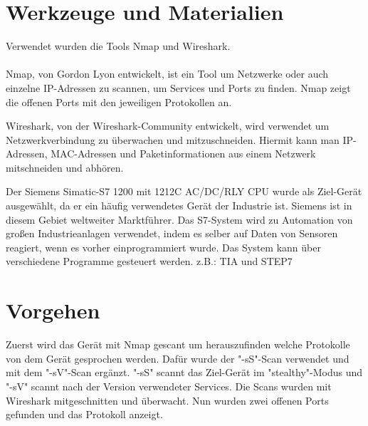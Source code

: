 \section{Werkzeuge und Materialien}

Verwendet wurden die Tools Nmap und Wireshark.\\
\\
 Nmap, von Gordon Lyon entwickelt, ist ein Tool um Netzwerke oder auch einzelne IP-Adressen zu scannen, um Services und Ports zu finden. 
Nmap zeigt die offenen Ports mit den jeweiligen Protokollen an.\cite{nmap}
	  
 Wireshark, von der Wireshark-Community entwickelt, wird verwendet um Netzwerkverbindung zu überwachen und mitzuschneiden.
 Hiermit kann man IP-Adressen, MAC-Adressen und Paketinformationen aus einem Netzwerk mitschneiden und abhören.\cite{wire}

 Der Siemens Simatic-S7 1200 mit 1212C AC/DC/RLY CPU wurde als Ziel-Gerät ausgewählt, da er ein häufig verwendetes Gerät der Industrie ist. 
Siemens ist in diesem Gebiet weltweiter Marktführer.
Das S7-System wird zu Automation von großen Industrieanlagen verwendet, indem es selber auf Daten von Sensoren reagiert, wenn es vorher einprogrammiert wurde.
Das System kann über verschiedene Programme gesteuert werden. z.B.: TIA und STEP7\cite{statis}




\cite{beuth}
\cite{RUB}
\cite{statis}
\cite{wire}
\cite{nmap}




\section{Vorgehen}
\label{sec:figs}
Zuerst wird das Gerät mit Nmap gescant um herauszufinden welche Protokolle von dem Gerät gesprochen werden.
Dafür wurde der "-sS"-Scan verwendet und mit dem "-sV"-Scan ergänzt.
"-sS" scannt das Ziel-Gerät im "stealthy"-Modus und "-sV" scannt nach der Version verwendeter Services.
Die Scans wurden mit Wireshark mitgeschnitten und überwacht. Nun wurden zwei offenen Ports gefunden und das Protokoll anzeigt.

